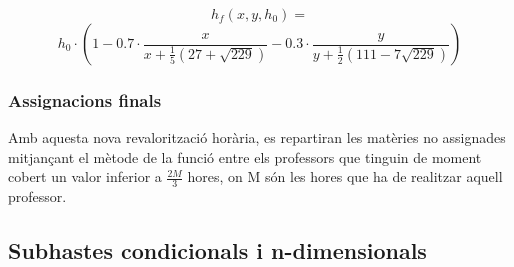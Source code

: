 \documentclass[10pt,twocolumn]{article}
\begin{document}
	$$h_f(x,y,h_0)=$$ $$h_0\cdot (1-0.7\cdot \frac{x}{x+\frac{1}{5}(27+\sqrt{229})}-0.3\cdot\frac{y}{y+\frac{1}{2}(111-7\sqrt{229})} )$$

\subsubsection{Assignacions finals}

Amb aquesta nova revalorització horària, es repartiran les matèries no assignades mitjançant el mètode de la funció entre els professors que tinguin de moment cobert un valor inferior a $\frac{2M}{3}$ hores, on M són les hores que ha de realitzar aquell professor.
\subsection{Subhastes condicionals i n-dimensionals}
\end{document}
